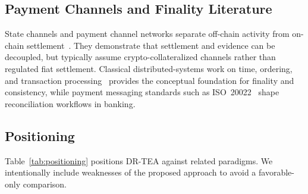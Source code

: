 \documentclass[journal]{IEEEtran}
\begin{document}
\subsection{Payment Channels and Finality Literature}
State channels and payment channel networks separate off-chain activity from on-chain settlement~\cite{poon2016lightning, gudgeon2020sok}. They demonstrate that settlement and evidence can be decoupled, but typically assume crypto-collateralized channels rather than regulated fiat settlement. Classical distributed-systems work on time, ordering, and transaction processing~\cite{lamport1978time, gray1992transaction} provides the conceptual foundation for finality and consistency, while payment messaging standards such as ISO~20022~\cite{iso20022} shape reconciliation workflows in banking.

\subsection{Positioning}
Table~\ref{tab:positioning} positions DR-TEA against related paradigms. We intentionally include weaknesses of the proposed approach to avoid a favorable-only comparison.
\end{document}
